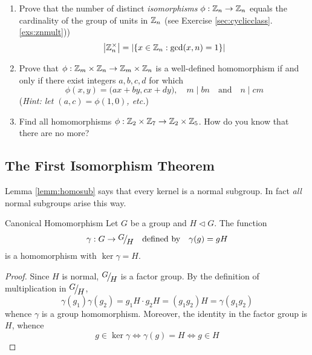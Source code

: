 \begin{exercises}
\begin{enumerate}
		
		\item\label{exs:totient} Prove that the number of distinct \emph{isomorphisms} $\phi:\mathbb{Z}_n\to\mathbb{Z}_n$ equals the cardinality of the group of units in $\mathbb{Z}_n$ (see Exercise \ref*{sec:cyclicclass}.\ref{exs:znmult}))
		\[
			\left| \mathbb{Z}_n^\times\right|=\left| \{x\in\mathbb{Z}_n:\gcd(x,n)=1\}\right|
		\]
			
			  
	  \item Prove that $\phi:\mathbb{Z}_m\times\mathbb{Z}_n\to\mathbb{Z}_m\times\mathbb{Z}_n$ is a well-defined homomorphism if and only if there exist integers $a,b,c,d$ for which
	  \[
	  	\phi(x,y)=\bigl(ax+by,cx+dy\bigr),\quad 
	  	m\mid bn\quad
	  	\text{and}\quad n\mid cm
	  \]
	  (\emph{Hint: let $(a,c)=\phi(1,0)$, etc.})
	  
	
		\item Find all homomorphisms $\phi:\mathbb{Z}_2\times\mathbb{Z}_7\to\mathbb{Z}_2\times\mathbb{Z}_5$. How do you know that there are no more?
		
% 		  
		
	\end{enumerate}
\end{exercises}

\clearpage


\subsection{The First Isomorphism Theorem}\label{sec:1stiso}

Lemma \ref{lemm:homosub} says that every kernel is a normal subgroup. In fact \emph{all} normal subgroups arise this way.

\begin{thm}{Canonical Homomorphism}{}
	Let $G$ be a group and $H\triangleleft G$. The function
	\[
		\gamma:G\to \quotient GH
		\quad\text{defined by}\quad 
		\gamma(g)=gH
	\]
	is a homomorphism with $\ker\gamma=H$.
\end{thm}

\begin{proof}
	Since $H$ is normal, $\quotient GH$ is a factor group. By the definition of multiplication in $\quotient GH$,
	\[
		\gamma(g_1)\gamma(g_2)
		=g_1H\cdot g_2H
		=(g_1g_2)H
		=\gamma(g_1g_2)
	\]
	whence $\gamma$ is a group homomorphism. Moreover, the identity in the factor group is $H$, whence
	\[
		g\in \ker\gamma \iff \gamma(g)=H \iff g\in H 
		\tag*{\qedhere}
	\]
\end{proof}

